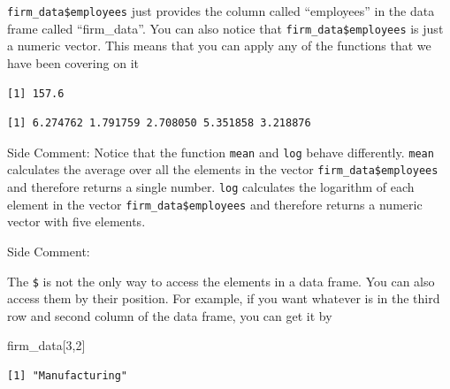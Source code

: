 \documentclass[
  letterpaper,
  DIV=11,
  numbers=noendperiod]{scrreprt}
\newenvironment{Shaded}{\begin{snugshade}}{\end{snugshade}}
\newcommand{\DecValTok}[1]{\textcolor[rgb]{0.68,0.00,0.00}{#1}}
\newcommand{\FunctionTok}[1]{\textcolor[rgb]{0.28,0.35,0.67}{#1}}
\newcommand{\NormalTok}[1]{\textcolor[rgb]{0.00,0.23,0.31}{#1}}
\newcommand{\SpecialCharTok}[1]{\textcolor[rgb]{0.37,0.37,0.37}{#1}}
\begin{document}
\texttt{firm\_data\$employees} just provides the column called
``employees'' in the data frame called ``firm\_data''. You can also
notice that \texttt{firm\_data\$employees} is just a numeric vector.
This means that you can apply any of the functions that we have been
covering on it

\begin{Shaded}
\end{Shaded}

\begin{verbatim}
[1] 157.6
\end{verbatim}

\begin{Shaded}
\end{Shaded}

\begin{verbatim}
[1] 6.274762 1.791759 2.708050 5.351858 3.218876
\end{verbatim}

{Side Comment:} Notice that the function \texttt{mean} and \texttt{log}
behave differently. \texttt{mean} calculates the average over all the
elements in the vector \texttt{firm\_data\$employees} and therefore
returns a single number. \texttt{log} calculates the logarithm of each
element in the vector \texttt{firm\_data\$employees} and therefore
returns a numeric vector with five elements.

{Side Comment:}

The \texttt{\$} is not the only way to access the elements in a data
frame. You can also access them by their position. For example, if you
want whatever is in the third row and second column of the data frame,
you can get it by

\begin{Shaded}
\begin{Highlighting}[]
\NormalTok{firm\_data[}\DecValTok{3}\NormalTok{,}\DecValTok{2}\NormalTok{]}
\end{Highlighting}
\end{Shaded}

\begin{verbatim}
[1] "Manufacturing"
\end{verbatim}
\end{document}
